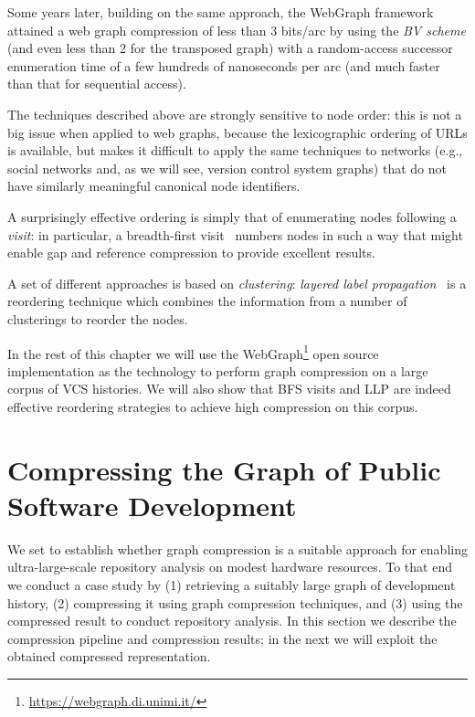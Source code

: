 Some years later, building on the same approach, the WebGraph
framework~\cite{BoVWFI} attained a web graph compression of less than 3
bits/arc by using the \emph{BV scheme} (and even less than 2 for the transposed
graph) with a random-access successor enumeration time of a few hundreds of
nanoseconds per arc (and much faster than that for sequential access).

The techniques described above are strongly sensitive to node order: this is
not a big issue when applied to web graphs, because the lexicographic ordering
of URLs is available, but makes it difficult to apply the same techniques to
networks (e.g., social networks and, as we will see, version control system
graphs) that do not have similarly meaningful canonical node identifiers.

A surprisingly effective ordering is simply that of enumerating nodes following
a \emph{visit}: in particular, a breadth-first visit~\cite{ApDGCB} numbers
nodes in such a way that might enable gap and reference compression to provide
excellent results.

A set of different approaches is based on \emph{clustering}: \emph{layered
  label propagation}~\cite{BRSLLP} is a reordering technique which combines
the information from a number of clusterings to reorder the nodes.

In the rest of this chapter we will use the
WebGraph\footnote{\url{https://webgraph.di.unimi.it/}} open source
implementation as the technology to perform graph compression on a large corpus
of VCS histories.  We will also show that \gls{BFS} visits and \gls{LLP} are
indeed effective reordering strategies to achieve high compression on this
corpus.

\section{Compressing the Graph of Public Software Development}%
\label{sec:compression-comp}

We set to establish whether graph compression is a suitable approach for
enabling ultra-large-scale repository analysis on modest hardware resources.
To that end we conduct a case study by (1) retrieving a suitably large
graph of development history, (2) compressing it using graph compression
techniques, and (3) using the compressed result to conduct repository analysis.
In this section we describe the compression pipeline and compression results;
in the next we will exploit the obtained compressed representation.

